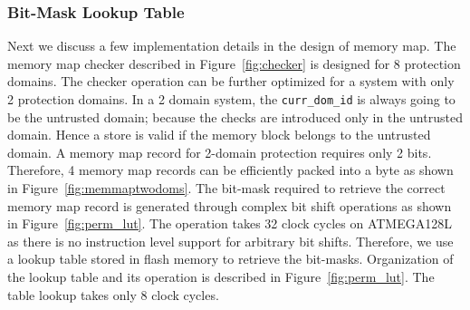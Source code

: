 \subsubsection{Bit-Mask Lookup Table}
\label{sec:bitmasklut}
%
Next we discuss a few implementation details in the design of
memory map.
%
The memory map checker described in Figure~\ref{fig:checker} is
designed for 8 protection domains.
%
The checker operation can be further optimized for a system with only 2
protection domains.
%
In a 2 domain system, the \texttt{curr\_dom\_id} is always going to be
the untrusted domain; because the checks are introduced only in the
untrusted domain.
%
Hence a store is valid if the memory block belongs to the untrusted
domain.
%
A memory map record for 2-domain protection requires only 2 bits.
%
Therefore, 4 memory map records can be efficiently packed into a byte
as shown in Figure~\ref{fig:memmaptwodoms}.
%
The bit-mask required to retrieve the correct memory map record is
generated through complex bit shift operations as shown in
Figure~\ref{fig:perm_lut}.
%
The operation takes 32 clock cycles on ATMEGA128L as there is no
instruction level support for arbitrary bit shifts.
%
Therefore, we use a lookup table stored in flash memory to retrieve
the bit-masks.
%
Organization of the lookup table and its operation is described in
Figure~\ref{fig:perm_lut}.
%
The table lookup takes only 8 clock cycles.
%
